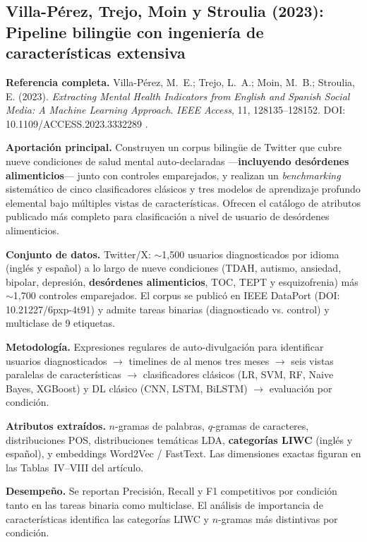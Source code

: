 \documentclass[journal]{IEEEtran}
\begin{document}
\subsection{Villa-Pérez, Trejo, Moin y Stroulia (2023): Pipeline bilingüe con ingeniería de características extensiva}

\textbf{Referencia completa.} Villa-Pérez, M.~E.; Trejo, L.~A.; Moin, M.~B.; Stroulia, E. (2023). \emph{Extracting Mental Health Indicators from English and Spanish Social Media: A Machine Learning Approach}. \textit{IEEE Access}, 11, 128135--128152. DOI: 10.1109/ACCESS.2023.3332289 \cite{villa2023bilingual}.

\textbf{Aportación principal.} Construyen un corpus bilingüe de Twitter que cubre nueve condiciones de salud mental auto-declaradas ---\textbf{incluyendo desórdenes alimenticios}--- junto con controles emparejados, y realizan un \emph{benchmarking} sistemático de cinco clasificadores clásicos y tres modelos de aprendizaje profundo elemental bajo múltiples vistas de características. Ofrecen el catálogo de atributos publicado más completo para clasificación a nivel de usuario de desórdenes alimenticios.

\textbf{Conjunto de datos.} Twitter/X: $\sim$1{,}500 usuarios diagnosticados por idioma (inglés y español) a lo largo de nueve condiciones (TDAH, autismo, ansiedad, bipolar, depresión, \textbf{desórdenes alimenticios}, TOC, TEPT y esquizofrenia) más $\sim$1{,}700 controles emparejados. El corpus se publicó en IEEE DataPort (DOI: 10.21227/6pxp-4t91) y admite tareas binarias (diagnosticado vs. control) y multiclase de 9 etiquetas.

\textbf{Metodología.} Expresiones regulares de auto-divulgación para identificar usuarios diagnosticados $\rightarrow$ timelines de al menos tres meses $\rightarrow$ seis vistas paralelas de características $\rightarrow$ clasificadores clásicos (LR, SVM, RF, Naive Bayes, XGBoost) y DL clásico (CNN, LSTM, BiLSTM) $\rightarrow$ evaluación por condición.

\textbf{Atributos extraídos.} $n$-gramas de palabras, $q$-gramas de caracteres, distribuciones POS, distribuciones temáticas LDA, \textbf{categorías LIWC} (inglés y español), y embeddings Word2Vec / FastText. Las dimensiones exactas figuran en las Tablas~IV--VIII del artículo.

\textbf{Desempeño.} Se reportan Precisión, Recall y F1 competitivos por condición tanto en las tareas binaria como multiclase. El análisis de importancia de características identifica las categorías LIWC y $n$-gramas más distintivas por condición.
\end{document}
